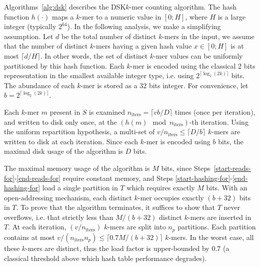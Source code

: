 \documentclass{bioinfo}
\newcommand{\dsk}{DSK\xspace}
\begin{document}
\begin{methods}
Algorithms~\ref{alg:dsk} describes the \dsk $k$-mer counting algorithm. 
The hash function $h(\cdot)$ maps a $k$-mer to a numeric value in $[0;H]$, where $H$ is a large integer (typically $2^{64}$). 
In the following analysis, we make a simplifying assumption. Let $d$ be the total number of distinct $k$-mers in the input, we assume that the number of distinct $k$-mers having a given hash value $x\in[0;H]$ is at most $\lceil d/H \rceil$. In other words, the set of distinct $k$-mer values can be uniformly partitioned by this hash function.
Each $k$-mer is encoded using the classical 2 bits representation in the smallest available integer type, i.e. using $2^{\lceil \log_2(2k)\rceil}$ bits. The abundance of each $k$-mer is stored as a $32$ bits integer. For convenience, let $b=2^{\lceil \log_2(2k)\rceil}$.

Each $k$-mer $m$ present in $S$ is examined $n_\textrm{iters} = \lceil vb / D \rceil$ times (once per iteration), and written to disk only once, at the $(h(m) \mod n_\textrm{iters})$-th iteration. 
Using the uniform repartition hypothesis, a multi-set of $v / n_\textrm{iters} \leq \lceil D/b \rceil$ $k$-mers are written to disk at each iteration. 
Since each $k$-mer is encoded using $b$ bits, the maximal disk usage of the algorithm is $D$ bits. 

The maximal memory usage of the algorithm is $M$ bits, since Steps~\ref{start-reads-for}-\ref{end-reads-for} require constant memory, and Steps \ref{start-hashing-for}-\ref{end-hashing-for} load a single partition in $T$ which requires exactly $M$ bits. With an open-addressing mechanism, each distinct $k$-mer occupies exactly $(b+32)$ bits in $T$. To prove that the algorithm terminates, it suffices to show that $T$ never overflows, i.e. that strictly less than $M/(b+32)$ distinct $k$-mers are inserted in $T$.
At each iteration, $(v/ n_\textrm{iters})$ $k$-mers are split into $n_p$ partitions. Each partition contains at most $ v / (n_\textrm{iters} n_p) \leq \lceil 0.7 M /(b+32) \rceil$ $k$-mers.
 In the worst case, all these $k$-mers are distinct, thus the load factor is upper-bounded by $0.7$ (a classical threshold above which hash table performance degrades).


\end{methods}
\end{document}
